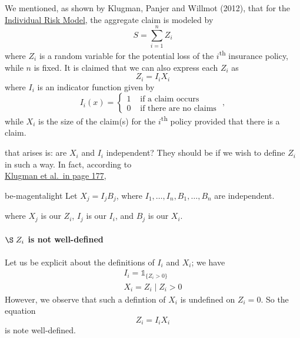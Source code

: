 \documentclass[notoc,notitlepage]{tufte-book}
\begin{document}
We mentioned, as shown by Klugman, Panjer and Willmot (2012)\cite{KlugmanPanjerWillmot2012}, that for the \hyperref[defn:individual_risk_model]{Individual Risk Model}, the aggregate claim is modeled by
\begin{equation*}
  S = \sum_{i=1}^{n} Z_i
\end{equation*}
where $Z_i$ is a random variable for the potential loss of the $i$\textsuperscript{th} insurance policy, while $n$ is fixed. It is claimed that we can also express each $Z_i$ as
\begin{equation*}
  Z_i = I_i X_i
\end{equation*}
where $I_i$ is an indicator function given by
\begin{equation*}
  I_i(x) = \begin{cases}
    1 & \text{ if a claim occurs } \\
    0 & \text{ if there are no claims }
  \end{cases},
\end{equation*}
while $X_i$ is the size of the claim(s) for the $i$\textsuperscript{th} policy provided that there is a claim.

 that arises is: are $X_i$ and $I_i$ independent? They should be if we wish to define $Z_i$ in such a way. In fact, according to \\
\noindent\textcolor{be-magenta}{\underline{Klugman et al.\ in page 177}},

\begin{quotebox}{be-magenta}{light}
  Let $X_j = I_j B_j$, where $I_1, \ldots, I_n, B_1, \ldots, B_n$ are independent.
\end{quotebox}

where $X_j$ is our $Z_i$, $I_j$ is our $I_i$, and $B_j$ is our $X_i$.

\paragraph{$\S \; Z_i$ is not well-defined} Let us be explicit about the definitions of $I_i$ and $X_i$; we have
\begin{gather*}
  I_i = \mathbb{1}_{\{ Z_i > 0 \}} \\
  X_i = Z_i \mid Z_i > 0
\end{gather*}
However, we observe that such a defintion of $X_i$ is undefined on $Z_i = 0$. So the equation
\begin{equation*}
  Z_i = I_i X_i
\end{equation*}
is note well-defined.
\end{document}
